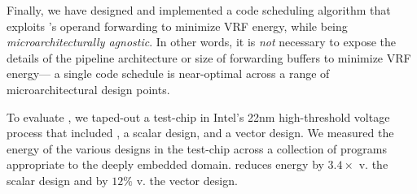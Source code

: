 Finally, we have designed and implemented a code scheduling algorithm
that exploits \manic's operand forwarding to minimize VRF energy, while being \emph{microarchitecturally agnostic}.
In other words, it is \emph{not} necessary to expose the details
of the pipeline architecture or size of forwarding buffers
to minimize VRF energy---%
a single code schedule is near-optimal across a range of microarchitectural design points.

To evaluate \manic, we taped-out a test-chip in Intel's 22nm high-threshold voltage process that included \manic, a scalar design, and a vector design.
We measured the energy of the various designs in the test-chip across a collection of programs appropriate to the deeply embedded domain.
%
\manic reduces energy by $3.4\times$ v. the scalar design and by $12\%$ v. the vector design.
% 
%